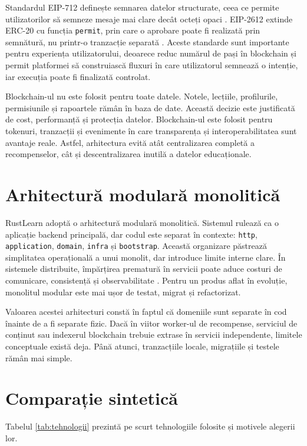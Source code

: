 Standardul EIP-712 definește semnarea datelor structurate, ceea ce permite utilizatorilor să semneze mesaje mai clare decât octeți opaci \cite{eip712}. EIP-2612 extinde ERC-20 cu funcția \texttt{permit}, prin care o aprobare poate fi realizată prin semnătură, nu printr-o tranzacție separată \cite{eip2612}. Aceste standarde sunt importante pentru experiența utilizatorului, deoarece reduc numărul de pași în blockchain și permit platformei să construiască fluxuri în care utilizatorul semnează o intenție, iar execuția poate fi finalizată controlat.

Blockchain-ul nu este folosit pentru toate datele. Notele, lecțiile, profilurile, permisiunile și rapoartele rămân în baza de date. Această decizie este justificată de cost, performanță și protecția datelor. Blockchain-ul este folosit pentru tokenuri, tranzacții și evenimente în care transparența și interoperabilitatea sunt avantaje reale. Astfel, arhitectura evită atât centralizarea completă a recompenselor, cât și descentralizarea inutilă a datelor educaționale.

\section{Arhitectură modulară monolitică}
RustLearn adoptă o arhitectură modulară monolitică. Sistemul rulează ca o aplicație backend principală, dar codul este separat în contexte: \texttt{http}, \texttt{application}, \texttt{domain}, \texttt{infra} și \texttt{bootstrap}. Această organizare păstrează simplitatea operațională a unui monolit, dar introduce limite interne clare. În sistemele distribuite, împărțirea prematură în servicii poate aduce costuri de comunicare, consistență și observabilitate \cite{coulouris2001distributed}. Pentru un produs aflat în evoluție, monolitul modular este mai ușor de testat, migrat și refactorizat.

Valoarea acestei arhitecturi constă în faptul că domeniile sunt separate în cod înainte de a fi separate fizic. Dacă în viitor worker-ul de recompense, serviciul de conținut sau indexerul blockchain trebuie extrase în servicii independente, limitele conceptuale există deja. Până atunci, tranzacțiile locale, migrațiile și testele rămân mai simple.



\section{Comparație sintetică}
Tabelul \ref{tab:tehnologii} prezintă pe scurt tehnologiile folosite și motivele alegerii lor.

